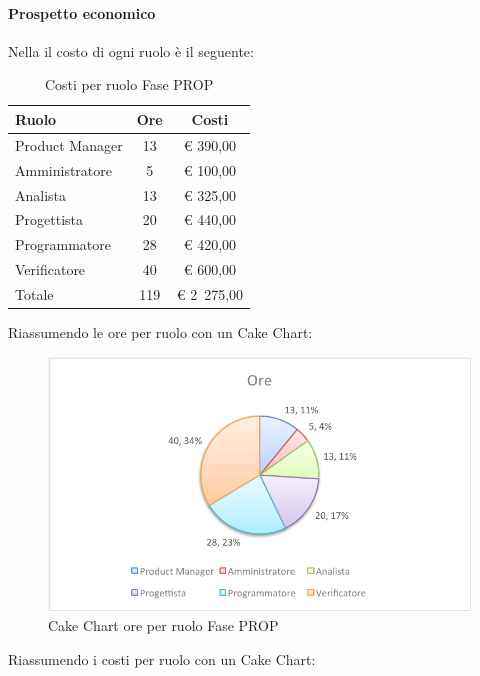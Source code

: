 			\paragraph{Prospetto economico}
				Nella  il costo di ogni ruolo è il seguente:
				\begin{table}[H]
					\begin{center}
						\begin{tabular}{| l | c | c |}
							\hline
							Ruolo 			& Ore 		& Costi  \\ \hline
							
							Product Manager	& 13 		& \euro{} 390,00 	\\
							Amministratore 		& 5 		& \euro{} 100,00 	\\
							Analista	 		& 13 		& \euro{} 325,00 	\\
							Progettista 		& 20 		& \euro{} 440,00  	\\
							Programmatore		& 28 		& \euro{} 420,00 	\\
							Verificatore		& 40 		& \euro{} 600,00 	\\ \hline \hline
							
							Totale	 		& 119 	& \euro{} 2~275,00 	\\ \hline
						\end{tabular}
					\end{center}
					\caption{Costi per ruolo Fase PROP}
				\end{table}
				Riassumendo le ore per ruolo con un Cake Chart:
				\begin{figure}[H]\centering
					\includegraphics[width=\textwidth]{PianoDiProgetto/Pics/ChartTotOreFasePROP.pdf}
					\caption{Cake Chart ore per ruolo Fase PROP}
				\end{figure}
				Riassumendo i costi per ruolo con un Cake Chart:
